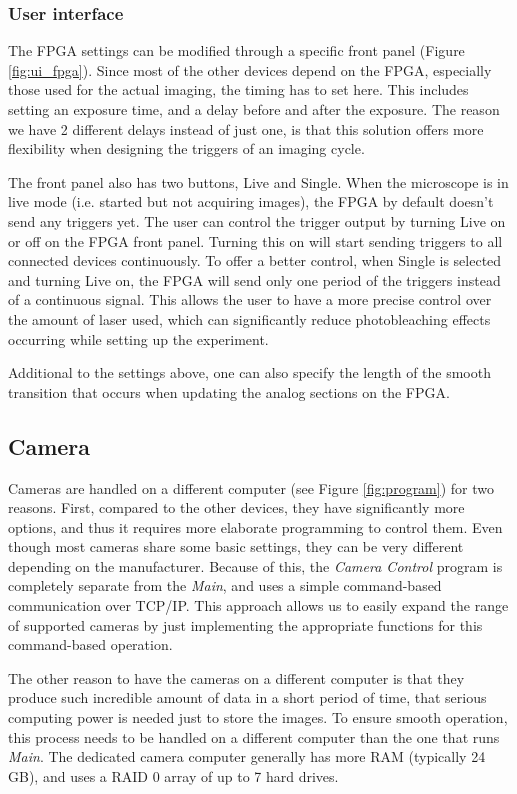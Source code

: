 \documentclass{diploma_style}
\begin{document}
\subsubsection{User interface}
The FPGA settings can be modified through a specific front panel (Figure \ref{fig:ui_fpga}). Since most of the other devices depend on the FPGA, especially those used for the actual imaging, the timing has to set here. This includes setting an exposure time, and a delay before and after the exposure. The reason we have 2 different delays instead of just one, is that this solution offers more flexibility when designing the triggers of an imaging cycle.

The front panel also has two buttons, Live and Single. When the microscope is in live mode (i.e. started but not acquiring images), the FPGA by default doesn't send any triggers yet. The user can control the trigger output by turning Live on or off on the FPGA front panel. Turning this on will start sending triggers to all connected devices continuously. To offer a better control, when Single is selected and turning Live on, the FPGA will send only one period of the triggers instead of a continuous signal. This allows the user to have a more precise control over the amount of laser used, which can significantly reduce photobleaching effects occurring while setting up the experiment.

Additional to the settings above, one can also specify the length of the smooth transition that occurs when updating the analog sections on the FPGA.



\subsection{Camera}
Cameras are handled on a different computer (see Figure \ref{fig:program}) for two reasons. First, compared to the other devices, they have significantly more options, and thus it requires more elaborate programming to control them. Even though most cameras share some basic settings, they can be very different depending on the manufacturer. Because of this, the \emph{Camera Control} program is completely separate from the \emph{Main}, and uses a simple command-based communication over TCP/IP. This approach allows us to easily expand the range of supported cameras by just implementing the appropriate functions for this command-based operation.

The other reason to have the cameras on a different computer is that they produce such incredible amount of data in a short period of time, that serious computing power is needed just to store the images. To ensure smooth operation, this process needs to be handled on a different computer than the one that runs \emph{Main}. The dedicated camera computer generally has more RAM (typically 24 GB), and uses a RAID 0 array of up to 7 hard drives.
\end{document}

